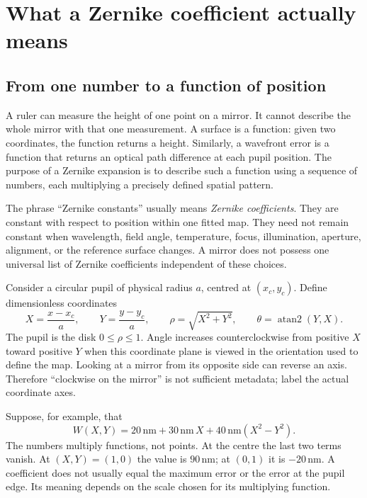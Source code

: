 
\chapter{What a Zernike coefficient actually means}
\label{zc:meaning}

\section{From one number to a function of position}
A ruler can measure the height of one point on a mirror. It cannot describe the
whole mirror with that one measurement. A surface is a function: given two
coordinates, the function returns a height. Similarly, a wavefront error is a
function that returns an optical path difference at each pupil position. The
purpose of a Zernike expansion is to describe such a function using a sequence
of numbers, each multiplying a precisely defined spatial pattern.

The phrase ``Zernike constants'' usually means \emph{Zernike coefficients}.
They are constant with respect to position within one fitted map. They need
not remain constant when wavelength, field angle, temperature, focus,
illumination, aperture, alignment, or the reference surface changes. A mirror
does not possess one universal list of Zernike coefficients independent of
these choices.

Consider a circular pupil of physical radius $a$, centred at $(x_c,y_c)$.
Define dimensionless coordinates
\begin{equation}
 X=\frac{x-x_c}{a},\qquad Y=\frac{y-y_c}{a},\qquad
 \rho=\sqrt{X^2+Y^2},\qquad \theta=\operatorname{atan2}(Y,X).
 \label{zc:coordinates}
\end{equation}
The pupil is the disk $0\leq\rho\leq1$. Angle increases counterclockwise
from positive $X$ toward positive $Y$ when this coordinate plane is viewed
in the orientation used to define the map. Looking at a mirror from its
opposite side can reverse an axis. Therefore ``clockwise on the mirror''
is not sufficient metadata; label the actual coordinate axes.

Suppose, for example, that
\begin{equation}
 W(X,Y)=20\,\mathrm{nm}+30\,\mathrm{nm}\,X
                  +40\,\mathrm{nm}(X^2-Y^2).
\end{equation}
The numbers multiply functions, not points. At the centre the last two
terms vanish. At $(X,Y)=(1,0)$ the value is $90\,\mathrm{nm}$; at
$(0,1)$ it is $-20\,\mathrm{nm}$. A coefficient does not usually equal
the maximum error or the error at the pupil edge. Its meaning depends on
the scale chosen for its multiplying function.

